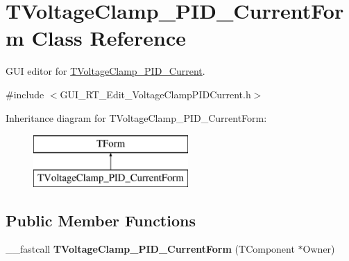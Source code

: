 \hypertarget{class_t_voltage_clamp___p_i_d___current_form}{\section{T\+Voltage\+Clamp\+\_\+\+P\+I\+D\+\_\+\+Current\+Form Class Reference}
\label{class_t_voltage_clamp___p_i_d___current_form}
}


G\+U\+I editor for \hyperlink{class_t_voltage_clamp___p_i_d___current}{T\+Voltage\+Clamp\+\_\+\+P\+I\+D\+\_\+\+Current}.  




{\ttfamily \#include $<$G\+U\+I\+\_\+\+R\+T\+\_\+\+Edit\+\_\+\+Voltage\+Clamp\+P\+I\+D\+Current.\+h$>$}

Inheritance diagram for T\+Voltage\+Clamp\+\_\+\+P\+I\+D\+\_\+\+Current\+Form\+:\begin{figure}[H]
\begin{center}
\leavevmode
\includegraphics[height=2.000000cm]{class_t_voltage_clamp___p_i_d___current_form}
\end{center}
\end{figure}
\subsection*{Public Member Functions}
\begin{DoxyCompactItemize}
\item 
\hypertarget{class_t_voltage_clamp___p_i_d___current_form_adcbe83e9836425272117042117f440d0}{\+\_\+\+\_\+fastcall {\bfseries T\+Voltage\+Clamp\+\_\+\+P\+I\+D\+\_\+\+Current\+Form} (T\+Component $\ast$Owner)}\label{class_t_voltage_clamp___p_i_d___current_form_adcbe83e9836425272117042117f440d0}

\end{DoxyCompactItemize}
